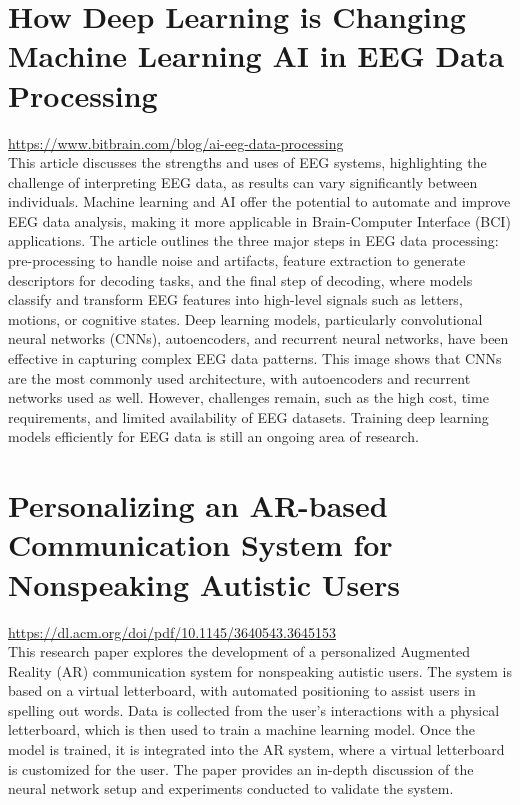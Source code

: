 \documentclass[12pt]{article}
\begin{document}
\section{How Deep Learning is Changing Machine Learning AI in EEG Data Processing}
\url{https://www.bitbrain.com/blog/ai-eeg-data-processing} \\
This article discusses the strengths and uses of EEG systems, highlighting the challenge of interpreting EEG data, as results can vary significantly between individuals. Machine learning and AI offer the potential to automate and improve EEG data analysis, making it more applicable in Brain-Computer Interface (BCI) applications. The article outlines the three major steps in EEG data processing: pre-processing to handle noise and artifacts, feature extraction to generate descriptors for decoding tasks, and the final step of decoding, where models classify and transform EEG features into high-level signals such as letters, motions, or cognitive states. Deep learning models, particularly convolutional neural networks (CNNs), autoencoders, and recurrent neural networks, have been effective in capturing complex EEG data patterns. This image shows that CNNs are the most commonly used architecture, with autoencoders and recurrent networks used as well. However, challenges remain, such as the high cost, time requirements, and limited availability of EEG datasets. Training deep learning models efficiently for EEG data is still an ongoing area of research.


\section{Personalizing an AR-based Communication System for Nonspeaking Autistic Users}
\url{https://dl.acm.org/doi/pdf/10.1145/3640543.3645153} \\
This research paper explores the development of a personalized Augmented Reality (AR) communication system for nonspeaking autistic users. The system is based on a virtual letterboard, with automated positioning to assist users in spelling out words. Data is collected from the user's interactions with a physical letterboard, which is then used to train a machine learning model. Once the model is trained, it is integrated into the AR system, where a virtual letterboard is customized for the user. The paper provides an in-depth discussion of the neural network setup and experiments conducted to validate the system.
\end{document}

